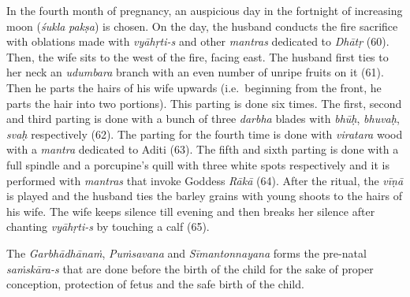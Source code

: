 \begin{enumerate}
  In the fourth month of pregnancy, an auspicious day in the fortnight of increasing moon (\emph{śukla} \emph{pakṣa}) is chosen. On the day, the husband conducts the fire sacrifice with oblations made with \emph{vyāhṛti-s} and other \emph{mantras} dedicated to \emph{Dhātṛ} (60). Then, the wife sits to the west of the fire, facing east. The husband first ties to her neck an \emph{udumbara} branch with an even number of unripe fruits on it (61). Then he parts the hairs of his wife upwards (i.e.\ beginning from the front, he parts the hair into two portions). This parting is done six times. The first, second and third parting is done with a bunch of three \emph{darbha} blades with \emph{bhūḥ}, \emph{bhuvaḥ}, \emph{svaḥ} respectively (62). The parting for the fourth time is done with \emph{viratara} wood with a \emph{mantra} dedicated to Aditi (63). The fifth and sixth parting is done with a full spindle and a porcupine's quill with three white spots respectively and it is performed with \emph{mantras} that invoke Goddess \emph{Rākā} (64). After the ritual, the \emph{vīṇā} is played and the husband ties the barley grains with young shoots to the hairs of his wife. The wife keeps silence till evening and then breaks her silence after chanting \emph{vyāhṛti-s} by touching a calf (65).
\end{enumerate}

The \emph{Garbhādhānaṁ}, \emph{Puṁsavana} and \emph{Sīmantonnayana} forms the pre-natal \emph{saṁskāra-s} that are done before the birth of the child for the sake of proper conception, protection of fetus and the safe birth of the child.

